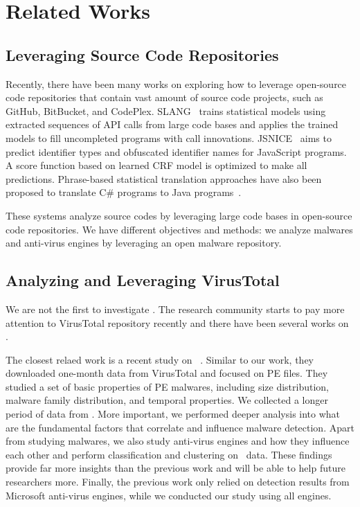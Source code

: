 \section{Related Works}
\label{sec:related}

\subsection{Leveraging Source Code Repositories}

Recently, there have been many works on exploring how to leverage open-source code repositories that contain vast amount of source code projects, 
such as GitHub, BitBucket, and CodePlex. 
SLANG~\cite{code-completion} trains statistical models using extracted sequences of API calls from large code bases
and applies the trained models to fill uncompleted programs with call innovations. 
JSNICE~\cite{big-predicting} aims to predict identifier types and obfuscated identifier names for JavaScript programs. 
A score function based on learned CRF model is optimized to make all predictions. 
Phrase-based statistical translation approaches have also been proposed
to translate C\# programs to Java programs~\cite{big-translation}. 

These systems analyze source codes by leveraging large code bases in open-source code repositories.
We have different objectives and methods: 
we analyze malwares and anti-virus engines by leveraging an open malware repository.


\subsection{Analyzing and Leveraging VirusTotal}
We are not the first to investigate \vt.
The research community starts to pay more attention to VirusTotal repository recently
and there have been several works on \vt.

The closest relaed work is a recent study on \vt{}~\cite{SongAPsys2016}. 
Similar to our work, they downloaded one-month data from VirusTotal
and focused on PE files.
They studied a set of basic properties of PE malwares,
including size distribution, malware family distribution, and temporal properties.   
We collected a longer period of data from \vt.
More important, we performed deeper analysis into what are the fundamental factors 
that correlate and influence malware detection.
Apart from studying malwares, we also study anti-virus engines and how they influence each other
and perform classification and clustering on \vt\ data.
These findings provide far more insights than the previous work and will be able to help future researchers more.
Finally, the previous work only relied on detection results from Microsoft anti-virus engines,
while we conducted our study using all engines.

